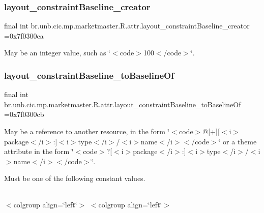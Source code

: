 \subsubsection{\texorpdfstring{layout\+\_\+constraint\+Baseline\+\_\+creator}{layout\_constraintBaseline\_creator}}
{\footnotesize\ttfamily final int br.\+unb.\+cic.\+mp.\+marketmaster.\+R.\+attr.\+layout\+\_\+constraint\+Baseline\+\_\+creator =0x7f0300ca\hspace{0.3cm}{\ttfamily [static]}}

May be an integer value, such as \char`\"{}$<$code$>$100$<$/code$>$\char`\"{}. \mbox{\label{classbr_1_1unb_1_1cic_1_1mp_1_1marketmaster_1_1R_1_1attr_a1eedb378235afe1c5493121628108b2b}} 
\subsubsection{\texorpdfstring{layout\+\_\+constraint\+Baseline\+\_\+to\+Baseline\+Of}{layout\_constraintBaseline\_toBaselineOf}}
{\footnotesize\ttfamily final int br.\+unb.\+cic.\+mp.\+marketmaster.\+R.\+attr.\+layout\+\_\+constraint\+Baseline\+\_\+to\+Baseline\+Of =0x7f0300cb\hspace{0.3cm}{\ttfamily [static]}}

May be a reference to another resource, in the form \char`\"{}$<$code$>$@\mbox{[}+\mbox{]}\mbox{[}$<$i$>$package$<$/i$>$\+:\mbox{]}$<$i$>$type$<$/i$>$/$<$i$>$name$<$/i$>$$<$/code$>$\char`\"{} or a theme attribute in the form \char`\"{}$<$code$>$?\mbox{[}$<$i$>$package$<$/i$>$\+:\mbox{]}$<$i$>$type$<$/i$>$/$<$i$>$name$<$/i$>$$<$/code$>$\char`\"{}. 

Must be one of the following constant values.

\tabulinesep=1mm
\begin{longtabu} spread 0pt [c]{*{0}{|X[-1]}|}
\hline
\end{longtabu}
$<$colgroup align=\char`\"{}left\char`\"{}$>$ $<$colgroup align=\char`\"{}left\char`\"{}$>$ 

